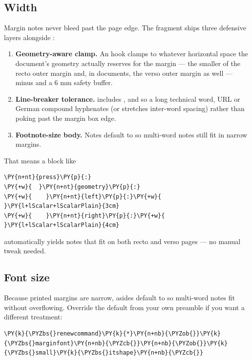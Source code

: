 \documentclass[a4paper,twoside]{article}
\begin{document}
\subsection{Width}
Margin notes never bleed past the page edge. The fragment ships three defensive
layers alongside :
\begin{enumerate}
\item \textbf{Geometry-aware clamp.} An  hook clamps
 to whatever horizontal space the document's geometry
actually reserves for the margin --- the smaller of the recto outer
margin and, in  documents, the verso outer margin as well ---
minus  and a 6 mm safety buffer.
\item \textbf{Line-breaker tolerance.}  includes ,
 and  so a long technical
word, URL or German compound hyphenates (or stretches inter-word
spacing) rather than poking past the margin box edge.
\item \textbf{Footnote-size body.} Notes default to  so multi-word
notes still fit in narrow margins.
\end{enumerate}
That means a  block like
\begin{tscode}[lang=yaml, engine=pygments]
\begin{Verbatim}[commandchars=\\\{\},breaklines, breakanywhere, commandchars=\\\{\}]
\PY{n+nt}{press}\PY{p}{:}
\PY{+w}{  }\PY{n+nt}{geometry}\PY{p}{:}
\PY{+w}{    }\PY{n+nt}{left}\PY{p}{:}\PY{+w}{ }\PY{l+lScalar+lScalarPlain}{3cm}
\PY{+w}{    }\PY{n+nt}{right}\PY{p}{:}\PY{+w}{ }\PY{l+lScalar+lScalarPlain}{4cm}
\end{Verbatim}
\end{tscode}
automatically yields notes that fit on both recto and verso pages --- no
manual  tweak needed.
\subsection{Font size}
Because printed margins are narrow, asides default to  so
multi-word notes fit without overflowing. Override the default from your own
preamble if you want a different treatment:
\begin{tscode}[lang=latex, engine=pygments]
\begin{Verbatim}[commandchars=\\\{\},breaklines, breakanywhere, commandchars=\\\{\}]
\PY{k}{\PYZbs{}renewcommand}\PY{k}{*}\PY{n+nb}{\PYZob{}}\PY{k}{\PYZbs{}marginfont}\PY{n+nb}{\PYZcb{}}\PY{n+nb}{\PYZob{}}\PY{k}{\PYZbs{}small}\PY{k}{\PYZbs{}itshape}\PY{n+nb}{\PYZcb{}}
\end{Verbatim}
\end{tscode}
\end{document}
